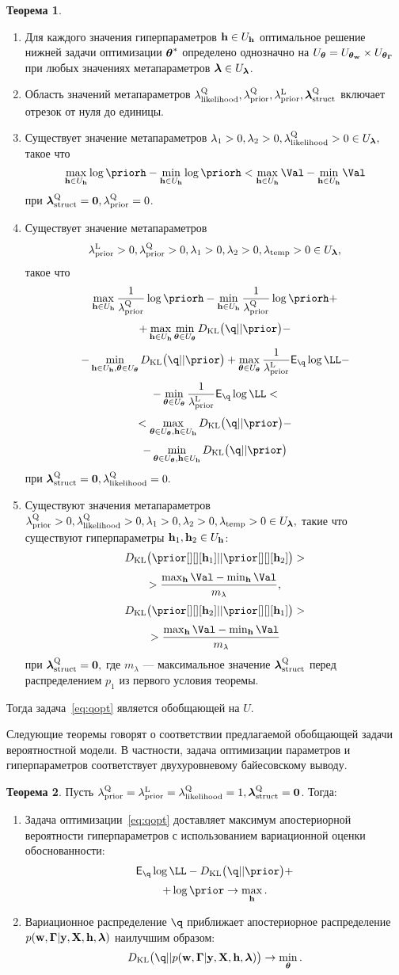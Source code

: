 \documentclass[11pt, a5paper]{dissert}
\theoremstyle{definition}
\newtheorem{theorem}{Теорема}
\begin{document}
{\begin{theorem}
\begin{enumerate}
\item Для каждого значения гиперпараметров $\mathbf{h} \in U_{\mathbf{h}}$ оптимальное решение нижней задачи оптимизации $\boldsymbol{\theta}^{*}$ определено однозначно на $U_{\boldsymbol{\theta}} = U_{\boldsymbol{\theta}_\mathbf{w}} \times U_{\boldsymbol{\theta}_{\boldsymbol{\Gamma}}}$ при любых значениях метапараметров $\boldsymbol{\lambda} \in U_{\boldsymbol{\lambda}}$.

\item Область значений метапараметров $\lambda_\text{likelihood}^\text{Q}, \lambda_\text{prior}^\text{Q}, \lambda_\text{prior}^\text{L}, \boldsymbol{\lambda}_\text{struct}^\text{Q}$ включает отрезок от нуля до единицы.

\item Существует значение метапараметров $\lambda_1>0, \lambda_2>0, \lambda_\text{likelihood}^\text{Q}>0  \in U_{\boldsymbol{\lambda}},$ такое что
\[
\max_{\h \in \Uh} \log \priorh -\min_{\h \in \Uh}\log \priorh < \max_{\h \in \Uh} \Val - \min_{\h \in \Uh} \Val
\] 
при $\boldsymbol{\lambda}_\text{struct}^\text{Q} = \mathbf{0}, \lambda_\text{prior}^\text{Q} = 0$.

\item Существует значение метапараметров $$\lambda_\text{prior}^\text{L}>0, \lambda_\text{prior}^\text{Q}>0, \lambda_1>0, \lambda_2>0, \lambda_{\text{temp}}>0 \in U_{\boldsymbol{\lambda}},$$ такое что 
\[
    \max_{\h \in \Uh} \frac{1}{\lamCQ}\log  \priorh - \min_{\h \in \Uh} \frac{1}{\lamCQ}\log  \priorh +
\]
\[
 + \max_{\h \in \Uh} \min_{\teta \in \Uteta} \KL{\q}{\prior} -
\]
\[ -\min_{\h \in \Uh, \teta \in \Uteta}  \KL{\q}{\prior} + \max_{\teta \in \Uteta}\frac{1}{\lamCL}\E_{\q} \log \LL - 
\]
\[
 - \min_{\teta \in \Uteta}\frac{1}{\lamCL}\E_{\q} \log \LL  <
\]
\[ 
< \max_{\teta \in \Uteta, \h \in \Uh} \KL{\q}{\prior} -
\]
\[
-\min_{\teta \in \Uteta, \h \in \Uh} \KL{\q}{\prior}
\]
при $\boldsymbol{\lambda}_\text{struct}^\text{Q} = \mathbf{0}, \lambda_\text{likelihood}^\text{Q} = 0.$

\item Существуют значения метапараметров $\lambda_\text{prior}^\text{Q}>0,\lambda_\text{likelihood}^\text{Q}>0, \lambda_1>0, \lambda_2>0, \lambda_{\text{temp}}>0  \in U_{\boldsymbol{\lambda}},$ такие что существуют гиперпараметры $\mathbf{h}_1, \mathbf{h}_2 \in U_{\mathbf{h}}$:
\[
\KL{\prior[][][\h_1]}{\prior[][][\h_2]} > 
\]
\[
>\frac{\max_{\h} \Val - \min_{\h} \Val }{m_{\lambda}},
\]
\[
\KL{\prior[][][\h_2]}{\prior[][][\h_1]} >
\]
\[
> \frac{\max_{\h} \Val - \min_{\h} \Val }{m_{\lambda}}
\]
при $\boldsymbol{\lambda}_\text{struct}^\text{Q} = \mathbf{0},$ где $m_{\lambda}$ --- максимальное значение $\boldsymbol{\lambda}_\text{struct}^\text{Q}$ перед распределением $p_1$ из первого условия теоремы.

\end{enumerate}
Тогда задача~\eqref{eq:qopt} является обобщающей на $U$.
\end{theorem}



Следующие теоремы говорят о соответствии предлагаемой обобщающей задачи вероятностной модели. В частности, задача оптимизации параметров и гиперпараметров соответствует двухуровневому байесовскому выводу.
\begin{theorem}
Пусть ${\lambda_\text{prior}^\text{Q}} = \lambda_\text{prior}^\text{L}=\lambda_\text{likelihood}^\text{Q} = 1, \boldsymbol{\lambda}_\text{struct}^\text{Q}=\mathbf{0}$. Тогда:
\begin{enumerate}
\item Задача оптимизации~\eqref{eq:qopt} доставляет максимум апостериорной вероятности гиперпараметров с использованием вариационной оценки обоснованности:
\[
    \E_{\q}\log \LL - \KL{\q}{\prior} +
\]
\[
+ \log \prior \to \max_{\h}.
\]
\item Вариационное распределение $\q$ приближает апостериорное распределение $p(\mathbf{w}, \boldsymbol{\Gamma}|\mathbf{y}, \mathbf{X}, \mathbf{h},\boldsymbol{\lambda})$ наилучшим образом:
\[
    \KL{\q}{\post} \to \min_{\teta}.
\]



\end{enumerate}
\end{theorem}}
\end{document}
